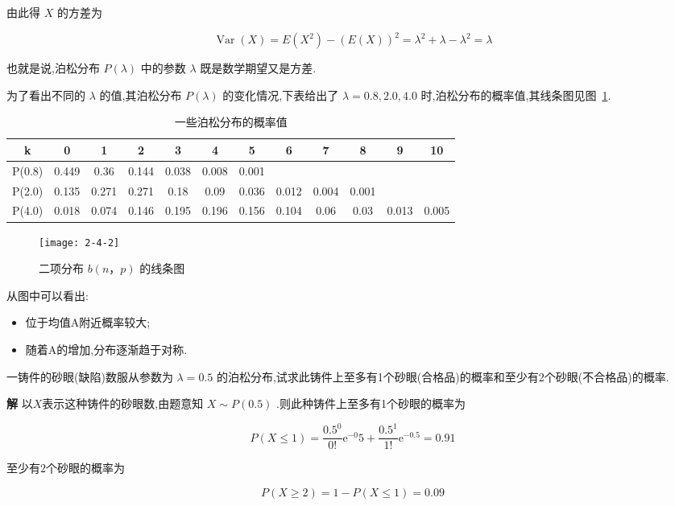 由此得 $ X $ 的方差为

\[
\operatorname{Var}(X)=E\left(X^{2}\right)-(E(X))^{2}=\lambda^{2}+\lambda-\lambda^{2}=\lambda
\]

也就是说,泊松分布 $ P(\lambda) $ 中的参数 $ \lambda $ 既是数学期望又是方差.

为了看出不同的 $ \lambda $ 的值,其泊松分布 $ P(\lambda) $ 的变化情况,下表给出了 $ \lambda =
0.8,2.0,4.0 $ 时,泊松分布的概率值,其线条图见图~\ref{fig:2.4.2}.

\begin{table}[htbp]
	\centering
	\caption{一些泊松分布的概率值}
	\begin{tabular}{c|ccccccccccc}
		\toprule
		k     & 0     & 1     & 2     & 3     & 4     & 5     & 6     & 7     & 8     & 9     & 10 \\\midrule
		P(0.8) & 0.449 & 0.36  & 0.144 & 0.038 & 0.008 & 0.001 &       &       &       &       &  \\
		P(2.0) & 0.135 & 0.271 & 0.271 & 0.18  & 0.09  & 0.036 & 0.012 & 0.004 & 0.001 &       &  \\
		P(4.0) & 0.018 & 0.074 & 0.146 & 0.195 & 0.196 & 0.156 & 0.104 & 0.06  & 0.03  & 0.013 & 0.005 \\\bottomrule
	\end{tabular}%
	\label{tab:2.4.2}%
\end{table}%

\begin{figure}
	\centering
	\texttt{[image: 2-4-2]}
	\caption{二项分布 $ b(n，p) $ 的线条图}
	\label{fig:2.4.2}
\end{figure}

从图中可以看出:

\begin{itemize}
	\item 位于均值A附近概率较大;
	\item 随着A的增加,分布逐渐趋于对称.
\end{itemize}

\begin{example}\label{exam:2.4.4}
	一铸件的砂眼(缺陷)数服从参数为 $ \lambda=0.5 $ 的泊松分布,试求此铸件上至多有1个砂眼(合格品)的概率和至少有2个砂眼(不合格品)的概率.
	
\textbf{解} 以$ X $表示这种铸件的砂眼数,由题意知 $ X \sim P(0.5) $ .则此种铸件上至多有1个砂眼的概率为

\[
P(X \leqslant 1)=\frac{0.5^{0}}{0 !} \mathrm{e}^{-0} 5+\frac{0.5^{1}}{1 !} \mathrm{e}^{-0.5}=0.91
\]

至少有2个砂眼的概率为

\[
P(X \geqslant 2)=1-P(X \leqslant 1)=0.09
\]
\end{example}

